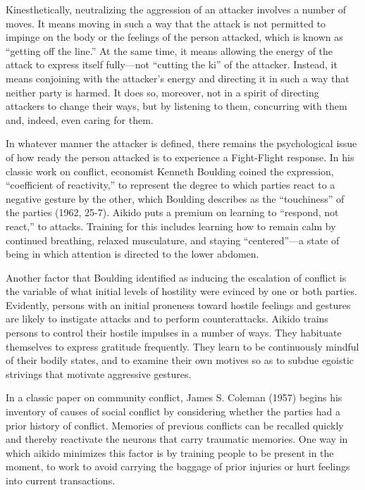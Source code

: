 Kinesthetically, neutralizing the aggression of an attacker involves a number of moves. It means moving in such a way that the attack is not permitted to impinge on the body or the feelings of the person attacked, which is known as ``getting off the line.'' At the same time, it means allowing the energy of the attack to express itself fully---not ``cutting the ki'' of the attacker. Instead, it means conjoining with the attacker's energy and directing it in such a way that neither party is harmed. It does so, moreover, not in a spirit of directing attackers to change their ways, but by listening to them, concurring with them and, indeed, even caring for them. 

In whatever manner the attacker is defined, there remains the psychological issue of how ready the person attacked is to experience a Fight-Flight response. In his classic work on conflict, economist Kenneth Boulding coined the expression, ``coefficient of reactivity,'' to represent the degree to which parties react to a negative gesture by the other, which Boulding describes as the ``touchiness'' of the parties (1962, 25-7). Aikido puts a premium on learning to ``respond, not react,'' to attacks. Training for this includes learning how to remain calm by continued breathing, relaxed musculature, and staying ``centered''---a state of being in which attention is directed to the lower abdomen. 

Another factor that Boulding identified as inducing the escalation of conflict is the variable of what initial levels of hostility were evinced by one or both parties. Evidently, persons with an initial proneness toward hostile feelings and gestures are likely to instigate attacks and to perform counterattacks. Aikido trains persons to control their hostile impulses in a number of ways. They habituate themselves to express gratitude frequently. They learn to be continuously mindful of their bodily states, and to examine their own motives so as to subdue egoistic strivings that motivate aggressive gestures. 

In a classic paper on community conflict, James S. Coleman (1957) begins his inventory of causes of social conflict by considering whether the parties had a prior history of conflict. Memories of previous conflicts can be recalled quickly and thereby reactivate the neurons that carry traumatic memories. One way in which aikido minimizes this factor is by training people to be present in the moment, to work to avoid carrying the baggage of prior injuries or hurt feelings into current transactions. 

